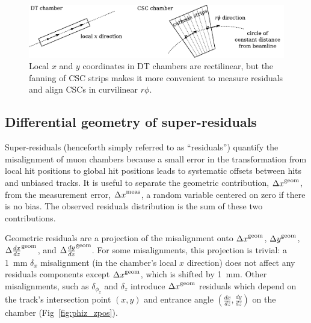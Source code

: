 \documentclass[12pt]{article}
\begin{document}
\begin{figure}
\begin{center} \includegraphics{strip_direction.pdf} \end{center}
\caption{Local $x$ and $y$ coordinates in DT chambers are rectilinear, but the fanning of CSC strips makes it more convenient to measure residuals and align CSCs in curvilinear $r\phi$. \label{fig:csc_localrphi}}
\end{figure}

\subsection{Differential geometry of super-residuals}

Super-residuals (henceforth simply referred to as ``residuals'')
quantify the misalignment of muon chambers because a small error in
the transformation from local hit positions to global hit positions
leads to systematic offsets between hits and unbiased tracks.  It is
useful to separate the geometric contribution, ${\Delta
  x}^{\mbox{\scriptsize geom}}$, from the measurement error, ${\Delta
  x}^{\mbox{\scriptsize meas}}$, a random variable centered on zero if
there is no bias.  The observed residuals distribution is the sum of
these two contributions.

Geometric residuals are a projection of the misalignment onto
${\Delta x}^{\mbox{\scriptsize geom}}$, ${\Delta y}^{\mbox{\scriptsize geom}}$,
${\Delta \frac{dx}{dz}}^{\mbox{\scriptsize geom}}$, and
${\Delta \frac{dy}{dz}}^{\mbox{\scriptsize geom}}$.  For some
misalignments, this projection is trivial: a 1~mm $\delta_x$
misalignment (in the chamber's local $x$ direction) does not affect
any residuals components except ${\Delta x}^{\mbox{\scriptsize geom}}$,
which is shifted by 1~mm.  Other misalignments, such as
$\delta_{\phi_z}$ and $\delta_z$ introduce
${\Delta x}^{\mbox{\scriptsize geom}}$ residuals which depend on the
track's intersection point $(x,y)$ and entrance angle $(\frac{dx}{dz},
\frac{dy}{dz})$ on the chamber (Fig~\ref{fig:phiz_zpos}).
\end{document}
